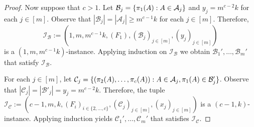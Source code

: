 \documentclass{patmorin}
\DeclarePairedDelimiter\set{\{}{\}}
\renewcommand{\mid}{:}  %
\begin{document}
\begin{proof}
Now suppose that $c>1$.
Let $\mathcal{B}_j=\set{\pi_1(A)\mid A\in\mathcal{A}_j}$ and
$y_j=m^{c-2}k$ for each $j\in[m]$. Observe that
$|\mathcal{B}_j|=|\mathcal{A}_j|\geq m^{c-1}k$ for each $j\in[m]$. 
Therefore,  
\[
  \mathcal{I}_{\mathcal{B}}:=(1,m,m^{c-1}k,(F_1),(\mathcal{B}_j)_{j\in[m]},(y_j)_{j\in[m]})
\]
is a $(1,m,m^{c-1}k)$-instance.  Applying induction on $\mathcal{I}_\mathcal{B}$ we obtain
$\mathcal{B}_1',\ldots,\mathcal{B}_m'$ that satisfy $\mathcal{I}_{\mathcal{B}}$.




 
For each $j\in[m]$, let $\mathcal{C}_j=\set{(\pi_2(A),\ldots,\pi_c(A))\mid A\in\mathcal{A}_j, \pi_1(A)\in \mathcal{B}'_j}$. Observe that
$|\mathcal{C}_j|=|\mathcal{B}'_j|=y_j=m^{c-2}k$.  Therefore, the tuple
$\mathcal{I}_{\mathcal{C}}:=(c-1,m,k,(F_i)_{i\in\{2,\ldots,c\}},(\mathcal{C}_j)_{j\in[m]},(x_j)_{j\in[m]})$
is a $(c-1,k)$-instance.  Applying induction yields $\mathcal{C}_1',\ldots,\mathcal{C}_m'$ that satisfies $\mathcal{I}_{\mathcal{C}}$.





\end{proof}
\end{document}
